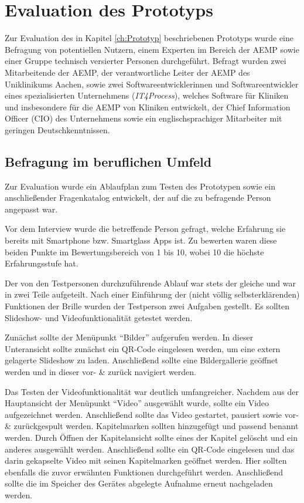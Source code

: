 %
%
%
%
%
%
\chapter{Evaluation des Prototyps}
\label{ch:Evaluation_des_Prototyps}
Zur Evaluation des in Kapitel \ref{ch:Prototyp} beschriebenen Prototyps wurde eine Befragung von potentiellen Nutzern, einem Experten im Bereich der AEMP sowie einer Gruppe technisch versierter Personen durchgeführt. Befragt wurden zwei
Mitarbeitende der AEMP, 
der verantwortliche Leiter der AEMP des Uniklinikums Aachen, 
sowie zwei Softwareentwicklerinnen und Softwareentwickler eines spezialisierten Unternehmens (\emph{IT4Process}), welches Software für Kliniken und insbesondere für die AEMP von Kliniken entwickelt, der Chief Information Officer (CIO) des Unternehmens sowie ein englischsprachiger Mitarbeiter mit geringen Deutschkenntnissen.
%
%
%
%
%
%
%
\section{Befragung im beruflichen Umfeld}
\label{sec:Befragung_im_Beruflichen_Umfeld}
Zur Evaluation wurde ein Ablaufplan zum Testen des Prototypen sowie ein anschließender Fragenkatalog entwickelt, der auf die zu befragende Person angepasst war. 

Vor dem Interview wurde die betreffende Person gefragt, welche Erfahrung sie bereits mit Smartphone bzw. Smartglass Apps ist. Zu bewerten waren diese beiden Punkte im Bewertungsbereich von 1 bis 10, wobei 10 die höchste Erfahrungsstufe hat.

Der von den Testpersonen durchzuführende Ablauf war stets der gleiche und war in zwei Teile aufgeteilt. Nach einer Einführung der (nicht völlig selbsterklärenden) Funktionen der Brille wurden der Testperson zwei Aufgaben gestellt. Es sollten Slideshow- und Videofunktionalität getestet werden. 

Zunächst sollte der Menüpunkt \enquote{Bilder} aufgerufen werden. In dieser Unteransicht sollte zunächst ein QR-Code eingelesen werden, um eine extern gelagerte Slideshow zu laden. Anschließend sollte eine Bildergallerie geöffnet werden und in dieser vor- \& zurück navigiert werden.

Das Testen der Videofunktionalität war deutlich umfangreicher. Nachdem aus der Hauptansicht der Menüpunkt \enquote{Video} ausgewählt wurde, sollte ein Video aufgezeichnet werden. Anschließend sollte das Video gestartet, pausiert sowie vor- \& zurückgespult werden. Kapitelmarken sollten hinzugefügt und passend benannt werden. Durch Öffnen der Kapitelansicht sollte eines der Kapitel gelöscht und ein anderes ausgewählt werden. Anschließend sollte ein QR-Code eingelesen und das darin gekapselte Video mit seinen Kapitelmarken geöffnet werden. Hier sollten ebenfalls die zuvor erwähnten Funktionen durchgeführt werden. Anschließend sollte die im Speicher des Gerätes abgelegte Aufnahme erneut nachgeladen werden.

